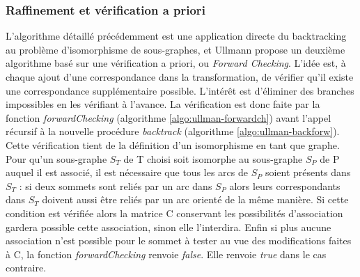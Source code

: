 \subsubsection{Raffinement et vérification a priori}
L'algorithme détaillé précédemment est une application directe du backtracking au problème d'isomorphisme de sous-graphes, et Ullmann propose un deuxième algorithme basé sur une vérification a priori, ou \emph{Forward Checking}. L'idée est, à chaque ajout d'une correspondance dans la transformation,
de vérifier qu'il existe une correspondance supplémentaire possible. L'intérêt est d'éliminer des branches impossibles en les vérifiant à l'avance. La vérification est donc faite par la fonction \emph{forwardChecking} (algorithme \ref{algo:ullman-forwardch}) avant l'appel récursif à la nouvelle procédure \emph{backtrack} (algorithme \ref{algo:ullman-backforw}). 
Cette vérification tient de la définition d'un isomorphisme en tant que graphe.
Pour qu'un sous-graphe $S_T$ de T choisi soit isomorphe au sous-graphe $S_P$ de P auquel il est associé, il est nécessaire que tous les arcs de $S_P$ soient présents dans $S_T$ : si deux sommets sont reliés par un arc dans $S_P$ alors leurs correspondants
dans $S_T$ doivent aussi être reliés par un arc orienté de la même manière. Si cette condition est vérifiée alors la matrice C conservant les possibilités d'association gardera
possible cette association, sinon elle l'interdira. Enfin si plus aucune association n'est possible pour le sommet à tester au vue des modifications faites à C, la fonction
\emph{forwardChecking} renvoie \emph{false}. Elle renvoie \emph{true} dans le cas contraire. 


